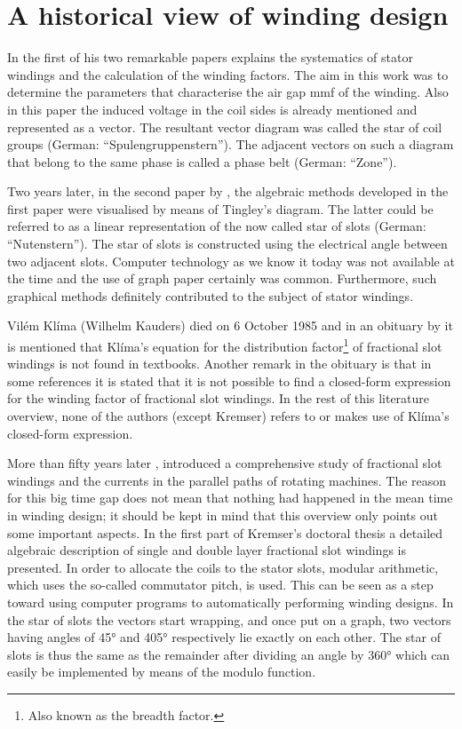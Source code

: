 \chapter{A historical view of winding design}
In the first of his two remarkable papers \cite{REF-00835, REF-00836} explains the systematics of stator windings and the calculation of the winding factors. The aim in this work was to determine the parameters that characterise the air gap mmf of the winding. Also in this paper the induced voltage in the coil sides is already mentioned and represented as a vector. The resultant vector diagram was called the star of coil groups (German: ``Spulengruppenstern''). The adjacent vectors on such a diagram that belong to the same phase is called a phase belt (German: ``Zone'').

Two years later, in the second paper by \cite{REF-00837}, the algebraic methods developed in the first paper were visualised by means of Tingley's diagram. The latter could be referred to as a linear representation of the now called star of slots (German: ``Nutenstern''). The star of slots is constructed using the electrical angle between two adjacent slots. Computer technology as we know it today was not available at the time and the use of graph paper certainly was common. Furthermore, such graphical methods definitely contributed to the subject of stator windings.

Vil\'em Kl\'ima (Wilhelm Kauders) died on 6 October 1985 and in an obituary by \cite{REF-01054} it is mentioned that Kl\'ima's equation for the distribution factor\footnote{Also known as the breadth factor.} of fractional slot windings is not found in textbooks. Another remark in the obituary is that in some references it is stated that it is not possible to find a closed-form expression for the winding factor of fractional slot windings. In the rest of this literature overview, none of the authors (except Kremser) refers to or makes use of Kl\'ima's closed-form expression. 

More than fifty years later \cite{REF-00837}, \cite{REF-00266} introduced a comprehensive study of fractional slot windings and the currents in the parallel paths of rotating machines. The reason for this big time gap does not mean that nothing had happened in the mean time in winding design; it should be kept in mind that this overview only points out some important aspects. In the first part of Kremser's doctoral thesis a detailed algebraic description of single and double layer fractional slot windings is presented. In order to allocate the coils to the stator slots, modular arithmetic, which uses the so-called commutator pitch, is used. This can be seen as a step toward using computer programs to automatically performing winding designs. In the star of slots the vectors start wrapping, and once put on a graph, two vectors having angles of \ang{45} and \ang{405} respectively lie exactly on each other. The star of slots is thus the same as the remainder after dividing an angle by \ang{360} which can easily be implemented by means of the modulo function.  

